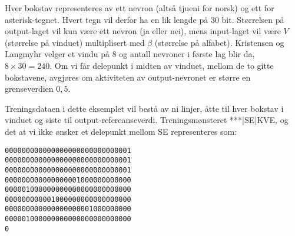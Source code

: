 Hver bokstav representeres av ett nevron (altså tjueni for norsk) og ett for asterisk-tegnet. Hvert tegn vil derfor ha en lik lengde på 30 bit. Størrelsen på output-laget vil kun være ett nevron (ja eller nei), mens input-laget vil være $V$ (størrelse på vinduet) multiplisert med $\beta$ (størrelse på alfabet). Kristensen og Langmyhr velger et vindu på 8 og antall nevroner i første lag blir da, $8\times 30 = 240$. Om vi får delepunkt i midten av vinduet, mellom de to gitte bokstavene, avgjøres om aktiviteten av output-nevronet er større en grenseverdien $0,5$. 

Treningsdataen i dette eksemplet vil bestå av ni linjer, åtte til hver bokstav i vinduet og siste til output-refereanseverdi. Treningsmønsteret ***|SE|KVE, og det at vi ikke ønsker et delepunkt mellom SE representeres som:

\begin{verbatim}
000000000000000000000000000001
000000000000000000000000000001
000000000000000000000000000001
000000000000000001000000000000
000001000000000000000000000000
000000000001000000000000000000
000000000000000000001000000000
000001000000000000000000000000
0
\end{verbatim}
